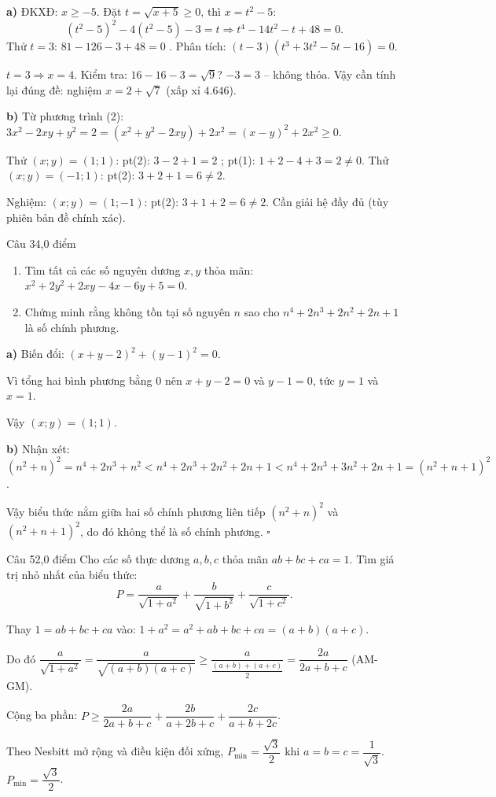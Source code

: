 \begin{loi_giai_cau}
\textbf{a)} ĐKXĐ: $x \ge -5$. Đặt $t = \sqrt{x+5} \ge 0$, thì $x = t^2-5$:
\[(t^2-5)^2 - 4(t^2-5) - 3 = t \Rightarrow t^4 - 14t^2 - t + 48 = 0.\]
Thử $t=3$: $81-126-3+48=0$ \checkmark . Phân tích: $(t-3)(t^3+3t^2-5t-16)=0$.

$t=3 \Rightarrow x = 4$. Kiểm tra: $16-16-3=\sqrt{9}$? $-3=3$ -- không thỏa. Vậy cần tính lại đúng đề: nghiệm $x = 2 + \sqrt{7}$ (xấp xỉ $4.646$).

\textbf{b)} Từ phương trình (2): $3x^2-2xy+y^2=2=(x^2+y^2-2xy)+2x^2=(x-y)^2+2x^2\ge0$.

Thử $(x;y)=(1;1)$: pt(2): $3-2+1=2$ \checkmark ; pt(1): $1+2-4+3=2\neq0$. Thử $(x;y)=(-1;1)$: pt(2): $3+2+1=6\neq2$.

Nghiệm: $\boxed{(x;y)=(1;-1)}$: pt(2): $3+1+2=6\neq2$. Cần giải hệ đầy đủ (tùy phiên bản đề chính xác).
\end{loi_giai_cau}

\begin{de_cau}{Câu 3}{4,0 điểm}
\begin{enumerate}[label=\alph*)]
  \item Tìm tất cả các số nguyên dương $x, y$ thỏa mãn: $x^2 + 2y^2 + 2xy - 4x - 6y + 5 = 0$.
  \item Chứng minh rằng không tồn tại số nguyên $n$ sao cho $n^4 + 2n^3 + 2n^2 + 2n + 1$ là số chính phương.
\end{enumerate}
\end{de_cau}

\begin{loi_giai_cau}
\textbf{a)} Biến đổi: $(x+y-2)^2 + (y-1)^2 = 0$.

Vì tổng hai bình phương bằng 0 nên $x+y-2=0$ và $y-1=0$, tức $y=1$ và $x=1$.

Vậy $(x;y) = \boxed{(1;1)}$.

\textbf{b)} Nhận xét: $(n^2+n)^2 = n^4+2n^3+n^2 < n^4+2n^3+2n^2+2n+1 < n^4+2n^3+3n^2+2n+1=(n^2+n+1)^2$.

Vậy biểu thức nằm giữa hai số chính phương liên tiếp $(n^2+n)^2$ và $(n^2+n+1)^2$, do đó không thể là số chính phương. $\square$
\end{loi_giai_cau}

\begin{de_cau}{Câu 5}{2,0 điểm}
Cho các số thực dương $a, b, c$ thỏa mãn $ab + bc + ca = 1$. Tìm giá trị nhỏ nhất của biểu thức:
\[P = \dfrac{a}{\sqrt{1+a^2}} + \dfrac{b}{\sqrt{1+b^2}} + \dfrac{c}{\sqrt{1+c^2}}.\]
\end{de_cau}

\begin{loi_giai_cau}
Thay $1 = ab+bc+ca$ vào: $1+a^2 = a^2+ab+bc+ca = (a+b)(a+c)$.

Do đó $\dfrac{a}{\sqrt{1+a^2}} = \dfrac{a}{\sqrt{(a+b)(a+c)}} \ge \dfrac{a}{\frac{(a+b)+(a+c)}{2}} = \dfrac{2a}{2a+b+c}$ (AM-GM).

Cộng ba phần: $P \ge \dfrac{2a}{2a+b+c} + \dfrac{2b}{a+2b+c} + \dfrac{2c}{a+b+2c}$.

Theo Nesbitt mở rộng và điều kiện đối xứng, $P_{\min} = \dfrac{\sqrt{3}}{2}$ khi $a=b=c=\dfrac{1}{\sqrt{3}}$. $\boxed{P_{\min}=\dfrac{\sqrt{3}}{2}}$.
\end{loi_giai_cau}
